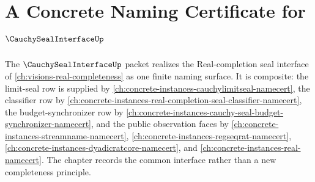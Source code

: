 \chapter{A Concrete Naming Certificate for $\CauchySealInterfaceUp$}
\label{ch:concrete-instances-cauchy-seal-interface-namecert}

The $\CauchySealInterfaceUp$ packet realizes the Real-completion seal interface of \autoref{ch:visions-real-completeness} as one finite naming surface. It is composite: the limit-seal row is supplied by \autoref{ch:concrete-instances-cauchylimitseal-namecert}, the classifier row by \autoref{ch:concrete-instances-real-completion-seal-classifier-namecert}, the budget-synchronizer row by \autoref{ch:concrete-instances-cauchy-seal-budget-synchronizer-namecert}, and the public observation faces by \autoref{ch:concrete-instances-streamname-namecert}, \autoref{ch:concrete-instances-regseqrat-namecert}, \autoref{ch:concrete-instances-dyadicratcore-namecert}, and \autoref{ch:concrete-instances-real-namecert}. The chapter records the common interface rather than a new completeness principle.

